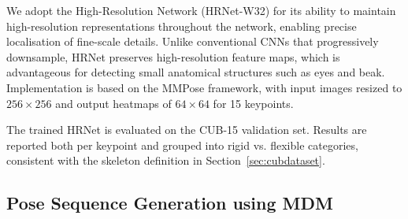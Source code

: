 \documentclass[final-report]{report-template}
\begin{document}
We adopt the High-Resolution Network (HRNet-W32) for its ability to maintain high-resolution representations throughout the network, enabling precise localisation of fine-scale details. Unlike conventional CNNs that progressively downsample, HRNet preserves high-resolution feature maps, which is advantageous for detecting small anatomical structures such as eyes and beak. Implementation is based on the MMPose framework, with input images resized to $256 \times 256$ and output heatmaps of $64 \times 64$ for 15 keypoints.  

The trained HRNet is evaluated on the CUB-15 validation set. 
Results are reported both per keypoint and grouped into rigid vs. flexible categories, consistent with the skeleton definition in Section~\ref{sec:cubdataset}.



\subsection{Pose Sequence Generation using MDM}




\end{document}
